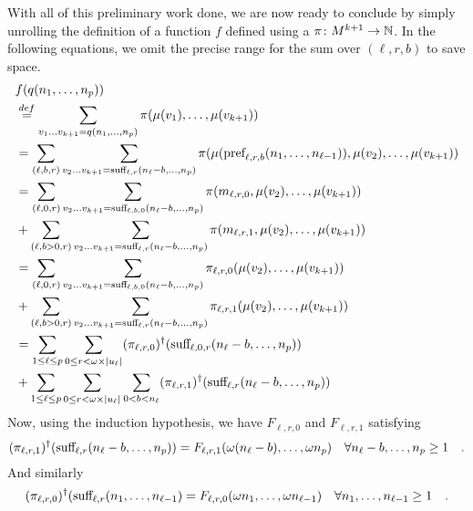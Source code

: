 \begin{proofof}
	With all of this preliminary work done, we are now ready to conclude by
	simply unrolling the definition of
	a function
	$f$ defined using a 
	$\pi \colon M^{k+1} \to \mathbb{N}$.
	In the following equations, we omit the precise
	range for the sum over $(\ell, r, b)$ to save space.
	\begin{align*}
		 & f(q(n_1, \dots, n_p))           \\
		 & \eqdef
		\sum_{v_1 \dots v_{k+1} = q(n_1, \dots, n_p)}
		\pi(\mu(v_1), \dots, \mu(v_{k+1})) \\
		 & = \sum_{(\ell, b, r)}
		\sum_{v_2 \dots v_{k+1} = \CutSuff{\ell,r}(n_\ell - b, \dots, n_p)}
		\pi(\mu(\CutPref{\ell,r,b}(n_1, \dots, n_{\ell-1})), \mu(v_2), \dots, \mu(v_{k+1}))
		\\
		 & =
		\sum_{(\ell, 0, r)}
		\sum_{v_2 \dots v_{k+1} = \CutSuff{\ell,b,0}(n_\ell - b, \dots, n_p)}
		\pi(m_{\ell,r,0}, \mu(v_2), \dots, \mu(v_{k+1}))
		\\
		 & +
		\sum_{(\ell, b > 0, r)}
		\sum_{v_2 \dots v_{k+1} = \CutSuff{\ell,r}(n_\ell - b, \dots, n_p)}
		\pi(m_{\ell,r,1}, \mu(v_2), \dots, \mu(v_{k+1}))
		\\
		 & =
		\sum_{(\ell, 0, r)}
		\sum_{v_2 \dots v_{k+1} = \CutSuff{\ell,b,0}(n_\ell - b, \dots, n_p)}
		\pi_{\ell,r,0}(\mu(v_2), \dots, \mu(v_{k+1}))
		\\
		 & +
		\sum_{(\ell, b > 0, r)}
		\sum_{v_2 \dots v_{k+1} = \CutSuff{\ell,r}(n_\ell-b, \dots, n_p)}
		\pi_{\ell,r,1}(\mu(v_2), \dots, \mu(v_{k+1}))
		\\
		 & =
		\sum_{1 \leq \ell \leq p}
		\sum_{0 \leq r < \omega \times \card{u_\ell}}
		(\pi_{\ell,r,0})^\dagger (\CutSuff{\ell, 0, r}(n_\ell-b, \dots, n_p))
		\\
		 & +
		\sum_{1 \leq \ell \leq p}
		\sum_{0 \leq r < \omega \times \card{u_\ell}}
		\sum_{0 < b < n_\ell}
		(\pi_{\ell,r,1})^{\dagger}(\CutSuff{\ell,r}(n_\ell - b, \dots, n_p))
	\end{align*}
	Now, using the induction hypothesis,
	we have  $F_{\ell,r,0}$ and $F_{\ell,r,1}$
	satisfying
	\begin{equation*}
		(\pi_{\ell,r,1})^{\dagger}(\text{suff}_{\ell,r}(n_\ell - b, \dots, n_p))
		= F_{\ell,r,1}(\omega (n_\ell - b), \dots, \omega n_p)
		\quad
		\forall n_\ell - b, \dots, n_p \geq 1
		\quad .
	\end{equation*}
	And similarly
	\begin{equation*}
		(\pi_{\ell,r,0})^{\dagger}(\text{suff}_{\ell,r}(n_1, \dots, n_{\ell-1})
		= F_{\ell,r,0}(\omega n_1, \dots, \omega n_{\ell-1})
		\quad
		\forall n_1, \dots, n_{\ell - 1} \geq 1
		\quad .
	\end{equation*}


\end{proofof}
